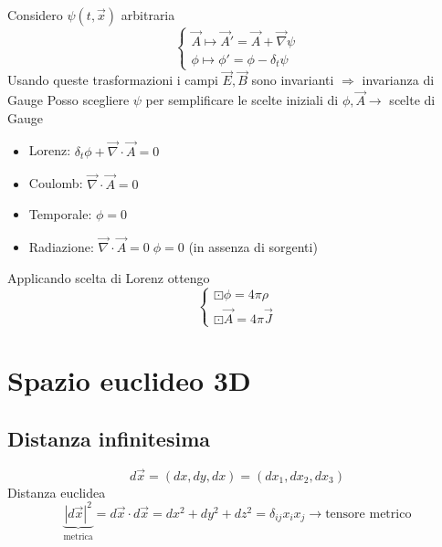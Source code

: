 Considero $\psi(t, \vec{x})$ arbitraria
\begin{equation*}
    \begin{cases}
        \vec{A} \mapsto \vec{A}' = \vec{A} + \vec{\nabla}\psi \\
        \phi \mapsto \phi' = \phi - \delta_t \psi 
    \end{cases}
\end{equation*}
Usando queste trasformazioni i campi $\vec{E}, \vec{B}$ sono invarianti $\Rightarrow$ invarianza di Gauge \newline
Posso scegliere $\psi$ per semplificare le scelte iniziali di $\phi,\vec{A} \rightarrow$ scelte di Gauge
\begin{itemize}
    \item Lorenz: $\delta_t \phi + \vec{\nabla} \cdot \vec{A} = 0$
    \item Coulomb: $\vec{\nabla} \cdot \vec{A} = 0$
    \item Temporale: $\phi = 0$
    \item Radiazione: $\vec{\nabla} \cdot \vec{A} = 0 \; \phi = 0$ (in assenza di sorgenti)
\end{itemize}
Applicando scelta di Lorenz ottengo
\begin{equation*}
    \begin{cases}
        \boxdot \phi = 4 \pi \rho \\
        \boxdot \vec{A} = 4 \pi \vec{J}
    \end{cases}
\end{equation*}

\section{Spazio euclideo 3D}

\subsection*{Distanza infinitesima}
\begin{equation*}
    d\vec{x} = (dx,dy,dx) = (dx_1,dx_2,dx_3)
\end{equation*}
Distanza euclidea
\begin{equation*}
    \underbrace{{|d\vec{x}|}^2}_{\text{metrica}} = d\vec{x} \cdot d\vec{x} = dx^2 + dy^2 + dz^2 = \delta_{ij}x_ix_j \rightarrow \text{tensore metrico}
\end{equation*}

